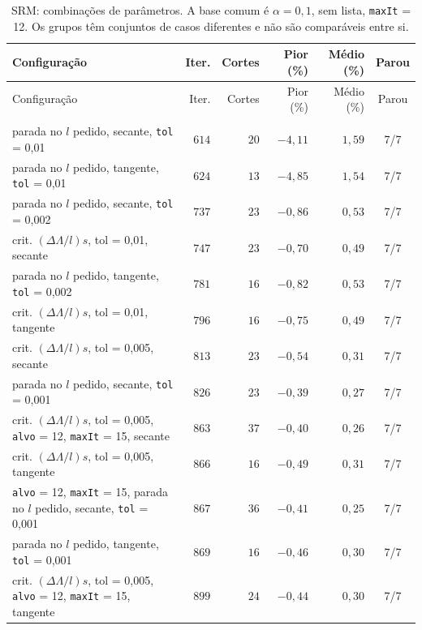 \documentclass[11pt,a4paper]{article}
\numberwithin{equation}{section}
\begin{document}
{\footnotesize
\begin{longtable}{p{7.8cm}rrrrc}
\caption{SRM: combinações de parâmetros. A base comum é $\alpha = 0{,}1$, sem lista, \texttt{maxIt} = 12. Os grupos têm conjuntos de casos diferentes e não são comparáveis entre si.}\label{tab:fatorial_srm}\\
\toprule
Configuração & Iter. & Cortes & Pior (\%) & Médio (\%) & Parou \\
\midrule
\endfirsthead
\toprule
Configuração & Iter. & Cortes & Pior (\%) & Médio (\%) & Parou \\
\midrule
\endhead
\bottomrule
\endfoot
\multicolumn{6}{l}{\textit{7 casos}} \\
parada no $l$ pedido, secante, \texttt{tol} = 0,01 & $614$ & $20$ & $-4{,}11$ & $1{,}59$ & 7/7 \\
parada no $l$ pedido, tangente, \texttt{tol} = 0,01 & $624$ & $13$ & $-4{,}85$ & $1{,}54$ & 7/7 \\
parada no $l$ pedido, secante, \texttt{tol} = 0,002 & $737$ & $23$ & $-0{,}86$ & $0{,}53$ & 7/7 \\
crit. $(\Delta\Lambda/l)s$, tol = 0,01, secante & $747$ & $23$ & $-0{,}70$ & $0{,}49$ & 7/7 \\
parada no $l$ pedido, tangente, \texttt{tol} = 0,002 & $781$ & $16$ & $-0{,}82$ & $0{,}53$ & 7/7 \\
crit. $(\Delta\Lambda/l)s$, tol = 0,01, tangente & $796$ & $16$ & $-0{,}75$ & $0{,}49$ & 7/7 \\
crit. $(\Delta\Lambda/l)s$, tol = 0,005, secante & $813$ & $23$ & $-0{,}54$ & $0{,}31$ & 7/7 \\
parada no $l$ pedido, secante, \texttt{tol} = 0,001 & $826$ & $23$ & $-0{,}39$ & $0{,}27$ & 7/7 \\
crit. $(\Delta\Lambda/l)s$, tol = 0,005, \texttt{alvo} = 12, \texttt{maxIt} = 15, secante & $863$ & $37$ & $-0{,}40$ & $0{,}26$ & 7/7 \\
crit. $(\Delta\Lambda/l)s$, tol = 0,005, tangente & $866$ & $16$ & $-0{,}49$ & $0{,}31$ & 7/7 \\
\texttt{alvo} = 12, \texttt{maxIt} = 15, parada no $l$ pedido, secante, \texttt{tol} = 0,001 & $867$ & $36$ & $-0{,}41$ & $0{,}25$ & 7/7 \\
parada no $l$ pedido, tangente, \texttt{tol} = 0,001 & $869$ & $16$ & $-0{,}46$ & $0{,}30$ & 7/7 \\
crit. $(\Delta\Lambda/l)s$, tol = 0,005, \texttt{alvo} = 12, \texttt{maxIt} = 15, tangente & $899$ & $24$ & $-0{,}44$ & $0{,}30$ & 7/7 \\

\end{longtable}}
\end{document}
